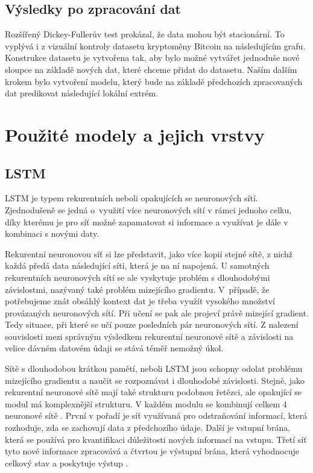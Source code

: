 \subsection{Výsledky po zpracování dat}

Rozšířený Dickey-Fullerův test prokázal, že data mohou být stacionární. 
To vyplývá i z vizuální kontroly datasetu kryptoměny Bitcoin na následujícím grafu. 
Konstrukce datasetu je vytvořena tak, aby bylo možné vytvářet jednoduše nové sloupce na základě nových dat, které chceme přidat do datasetu. 
Naším dalším krokem bylo vytvoření modelu, který bude na základě předchozích zpracovaných dat predikovat následující lokální extrém.

\section{Použité modely a jejich vrstvy}

\subsection{LSTM}

LSTM je typem rekurentních neboli opakujících se neuronových sítí. Zjednodušeně se jedná o~využití více neuronových sítí v rámci jednoho celku, díky kterému je pro síť možné zapamatovat si informace a využívat je dále v kombinaci s novými daty. 

Rekurentní neuronovou síť si lze představit, jako více kopií stejné sítě, z nichž každá předá data následující síti, která je na ní napojená. 
U samotných rekurentních neuronových sítí se ale vyskytuje problém s dlouhodobými závislostmi, nazývaný také problém mizejícího gradientu.
V~případě, že potřebujeme znát obsáhlý kontext dat je třeba využít vysokého množství provázaných neuronových sítí. 
Při učení se pak ale projeví právě mizející gradient.
Tedy situace, při které se učí pouze posledních pár neuronových sítí.
Z nalezení souvislosti mezi správným výsledkem rekurentní neuronové sítě a závislosti na velice dávném datovém údaji se stává téměř nemožný úkol.

Sítě s dlouhodobou krátkou pamětí, neboli LSTM jsou schopny odolat problému mizejícího gradientu a naučit se rozpoznávat i dlouhodobé závislosti.
Stejně, jako rekurentní neuronové sítě mají také strukturu podobnou řetězci, ale opakující se modul má komplexnější strukturu. V každém modulu se kombinují celkem 4 neuronové sítě \cite{lstm}. 
První v pořadí je síť využívaná pro odstraňování informací, která rozhoduje, zda se zachovají data z předchozího údaje.
Další je vstupní brána, která se používá pro kvantifikaci důležitosti nových informací na vstupu. 
Třetí síť tyto nové informace zpracovává a čtvrtou je výstupní brána, která vyhodnocuje celkový stav a poskytuje výstup \cite{gates}.

